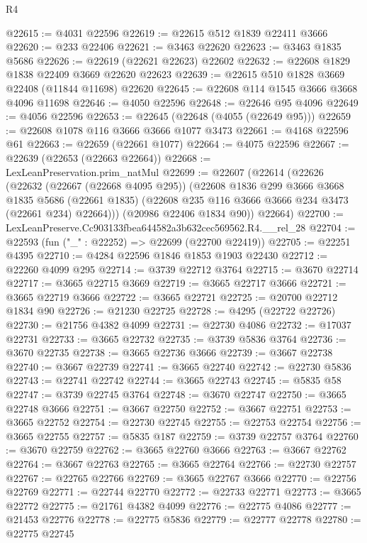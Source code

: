 \begin{lexlean}{R4}
\begin{coremodule}
@22615 := @4031 @22596
@22619 := @22615 @512 @1839 @22411 @3666
@22620 := @233 @22406
@22621 := @3463 @22620
@22623 := @3463 @1835 @5686
@22626 := @22619 (@22621 @22623) @22602
@22632 := @22608 @1829 @1838 @22409 @3669 @22620 @22623
@22639 := @22615 @510 @1828 @3669 @22408 (@11844 @11698) @22620
@22645 := @22608 @114 @1545 @3666 @3668 @4096 @11698
@22646 := @4050 @22596
@22648 := @22646 @95 @4096
@22649 := @4056 @22596
@22653 := @22645 (@22648 (@4055 (@22649 @95)))
@22659 := @22608 @1078 @116 @3666 @3666 @1077 @3473
@22661 := @4168 @22596 @61
@22663 := @22659 (@22661 @1077)
@22664 := @4075 @22596
@22667 := @22639 (@22653 (@22663 @22664))
@22668 := LexLeanPreservation.prim_natMul
@22699 := @22607
    (@22614
      (@22626
        (@22632
          (@22667 (@22668 @4095 @295))
          (@22608
            @1836
            @299
            @3666
            @3668
            @1835
            @5686
            (@22661 @1835)
            (@22608 @235 @116 @3666 @3666 @234 @3473 (@22661 @234) @22664)))
        (@20986 @22406 @1834 @90))
      @22664)
@22700 := LexLeanPreserve.Cc903133fbea644582a3b632cec569562.R4.__rel_28
@22704 := @22593 (fun ("_" : @22252) => @22699 (@22700 @22419))
@22705 := @22251 @4395
@22710 := @4284 @22596 @1846 @1853 @1903 @22430
@22712 := @22260 @4099 @295
@22714 := @3739 @22712 @3764
@22715 := @3670 @22714
@22717 := @3665 @22715 @3669
@22719 := @3665 @22717 @3666
@22721 := @3665 @22719 @3666
@22722 := @3665 @22721
@22725 := @20700 @22712 @1834 @90
@22726 := @21230 @22725
@22728 := @4295 (@22722 @22726)
@22730 := @21756 @4382 @4099
@22731 := @22730 @4086
@22732 := @17037 @22731
@22733 := @3665 @22732
@22735 := @3739 @5836 @3764
@22736 := @3670 @22735
@22738 := @3665 @22736 @3666
@22739 := @3667 @22738
@22740 := @3667 @22739
@22741 := @3665 @22740
@22742 := @22730 @5836
@22743 := @22741 @22742
@22744 := @3665 @22743
@22745 := @5835 @58
@22747 := @3739 @22745 @3764
@22748 := @3670 @22747
@22750 := @3665 @22748 @3666
@22751 := @3667 @22750
@22752 := @3667 @22751
@22753 := @3665 @22752
@22754 := @22730 @22745
@22755 := @22753 @22754
@22756 := @3665 @22755
@22757 := @5835 @187
@22759 := @3739 @22757 @3764
@22760 := @3670 @22759
@22762 := @3665 @22760 @3666
@22763 := @3667 @22762
@22764 := @3667 @22763
@22765 := @3665 @22764
@22766 := @22730 @22757
@22767 := @22765 @22766
@22769 := @3665 @22767 @3666
@22770 := @22756 @22769
@22771 := @22744 @22770
@22772 := @22733 @22771
@22773 := @3665 @22772
@22775 := @21761 @4382 @4099
@22776 := @22775 @4086
@22777 := @21453 @22776
@22778 := @22775 @5836
@22779 := @22777 @22778
@22780 := @22775 @22745

\end{coremodule}
\end{lexlean}
